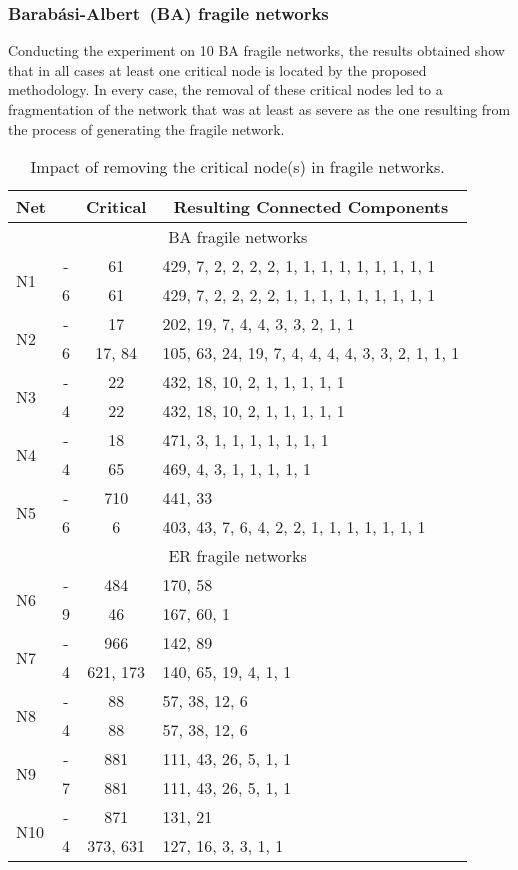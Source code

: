\documentclass[conference,fleqn]{IEEEtran}
\begin{document}
\subsubsection{Barab\'{a}si-Albert~(BA) fragile networks}
Conducting the experiment on 10 BA fragile networks, the results obtained show that in all cases at least one critical node is
located by the proposed methodology. In every case, the removal of these critical nodes led to a fragmentation of the network that was at least
as severe as the one resulting from the process of generating the fragile network. 

\begin{table*}[ht]
\caption{Impact of removing the critical node(s) in fragile networks.}
\label{tab:fragile}
\begin{center}
\begin{tabular}{|l|c|c|l|}
\hline
Net  &  & Critical & \multicolumn{1}{c|}{Resulting Connected Components} \\ \hline
\multicolumn{4}{c}{BA fragile networks} \\ \hline
\multirow{2}{2mm}{N1} & - & 61 & 429, 7, 2, 2, 2, 2, 1, 1, 1, 1, 1, 1, 1, 1, 1 \\ 
 & 6 & 61 & 429, 7, 2, 2, 2, 2, 1, 1, 1, 1, 1, 1, 1, 1, 1 \\ \hline
\multirow{2}{2mm}{N2}  & - & 17 & 202, 19, 7, 4, 4, 3, 3, 2, 1, 1 \\ 
 & 6 & 17, 84 & 105, 63, 24, 19, 7, 4, 4, 4, 4, 3, 3, 2, 1, 1, 1 \\ \hline
\multirow{2}{2mm}{N3} & - & 22 & 432, 18, 10, 2, 1, 1, 1, 1, 1 \\ 
 & 4 & 22 & 432, 18, 10, 2, 1, 1, 1, 1, 1 \\ \hline
\multirow{2}{2mm}{N4} & - & 18 & 471, 3, 1, 1, 1, 1, 1, 1, 1 \\ 
 & 4 & 65 & 469, 4, 3, 1, 1, 1, 1, 1 \\ \hline
\multirow{2}{2mm}{N5} & - & 710 & 441, 33 \\ 
 & 6 & 6 & 403, 43, 7, 6, 4, 2, 2, 1, 1, 1, 1, 1, 1, 1 \\ \hline
\multicolumn{4}{c}{ER fragile networks} \\ \hline
\multirow{2}{2mm}{N6} & - & 484 & 170, 58 \\ 
 & 9 & 46 & 167, 60, 1 \\ \hline
\multirow{2}{2mm}{N7} & - & 966 & 142, 89 \\ 
 & 4 & 621, 173 & 140, 65, 19, 4, 1, 1 \\ \hline
\multirow{2}{2mm}{N8} & - & 88 & 57, 38, 12, 6 \\ 
 & 4 & 88 & 57, 38, 12, 6 \\ \hline
\multirow{2}{2mm}{N9} & - & 881 & 111, 43, 26, 5, 1, 1 \\ 
 & 7 & 881 & 111, 43, 26, 5, 1, 1 \\\hline 
\multirow{2}{2mm}{N10} & - & 871 & 131, 21 \\ 
 & 4 & 373, 631 & 127, 16, 3, 3, 1, 1 \\ \hline
\end{tabular}
\end{center}
\end{table*}
\end{document}

